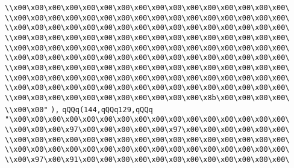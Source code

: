 \verb|\\x00\x00\x00\x00\x00\x00\x00\x00\x00\x00\x00\x00\x00\x00\x00\x00\|\newline
\verb|\\x00\x00\x00\x00\x00\x00\x00\x00\x00\x00\x00\x00\x00\x00\x00\x00\|\newline
\verb|\\x00\x00\x00\x00\x00\x00\x00\x00\x00\x00\x00\x00\x00\x00\x00\x00\|\newline
\verb|\\x00\x00\x00\x00\x00\x00\x00\x00\x00\x00\x00\x00\x00\x00\x00\x00\|\newline
\verb|\\x00\x00\x00\x00\x00\x00\x00\x00\x00\x00\x00\x00\x00\x00\x00\x00\|\newline
\verb|\\x00\x00\x00\x00\x00\x00\x00\x00\x00\x00\x00\x00\x00\x00\x00\x00\|\newline
\verb|\\x00\x00\x00\x00\x00\x00\x00\x00\x00\x00\x00\x00\x00\x00\x00\x00\|\newline
\verb|\\x00\x00\x00\x00\x00\x00\x00\x00\x00\x00\x00\x00\x00\x00\x00\x00\|\newline
\verb|\\x00\x00\x00\x00\x00\x00\x00\x00\x00\x00\x00\x00\x00\x00\x00\x00\|\newline
\verb|\\x00\x00\x00\x00\x00\x00\x00\x00\x00\x00\x00\x8b\x00\x00\x00\x00\|\newline
\verb|\\x00\x00"|\newline
\verb|),|\newline
\verb|qQQq(144,qQQq129,qQQq|\newline
\verb|"\x00\x00\x00\x00\x00\x00\x00\x00\x00\x00\x00\x00\x00\x00\x00\x00\|\newline
\verb|\\x00\x00\x00\x97\x00\x00\x00\x00\x00\x97\x00\x00\x00\x00\x00\x00\|\newline
\verb|\\x00\x00\x00\x00\x00\x00\x00\x00\x00\x00\x00\x00\x00\x00\x00\x00\|\newline
\verb|\\x00\x00\x00\x00\x00\x00\x00\x00\x00\x00\x00\x00\x00\x00\x00\x00\|\newline
\verb|\\x00\x97\x00\x91\x00\x00\x00\x00\x00\x00\x00\x00\x00\x00\x00\x00\|\newline

